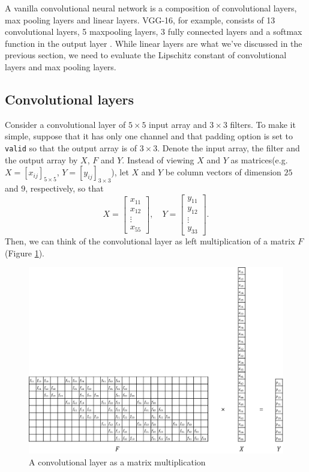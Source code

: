 \documentclass[12pt]{report}
\numberwithin{figure}{chapter}
\theoremstyle{plain}
\theoremstyle{definition}
\theoremstyle{corollary}
\theoremstyle{definition}
\theoremstyle{plain}
\theoremstyle{definition}
\theoremstyle{plain}
\begin{document}
A vanilla convolutional neural network is a composition of convolutional layers, max pooling layers and linear layers.
VGG-16, for example, consists of 13 convolutional layers, 5 maxpooling layers, 3 fully connected layers and a softmax function in the output layer \cite{SK-ZA}.
While linear layers are what we've discussed in the previous section, we need to evaluate the Lipschitz constant of convolutional layers and max pooling layers.

\subsection{Convolutional layers}\label{convolutional_layers}
Consider a convolutional layer of \(5\times 5\) input array and \(3\times 3\) filters.
To make it simple, suppose that it has only one channel and that padding option is set to \texttt{valid} so that the output array is of \(3\times 3\).
Denote the input array, the filter and the output array by \(X\), \(F\) and \(Y\).
Instead of viewing \(X\) and \(Y\) as matrices(e.g. \(X=[x_{ij}]_{5\times 5}\), \(Y=[y_{ij}]_{3\times 3}\)), let \(X\) and \(Y\) be column vectors of dimension \(25\) and \(9\), respectively, so that
\[X=\begin{bmatrix}x_{11}\\x_{12}\\\vdots\\x_{55}\end{bmatrix},\quad
Y=\begin{bmatrix}y_{11}\\y_{12}\\\vdots\\y_{33}\end{bmatrix}.\]
Then, we can think of the convolutional layer as left multiplication of a matrix \(F\) (Figure \ref{convolution_matrix}).

\begin{figure}[t]
\centering
\includegraphics[width=\textwidth]{convolution_matrix}
\caption{A convolutional layer as a matrix multiplication}
\label{convolution_matrix}
\end{figure}
\end{document}
